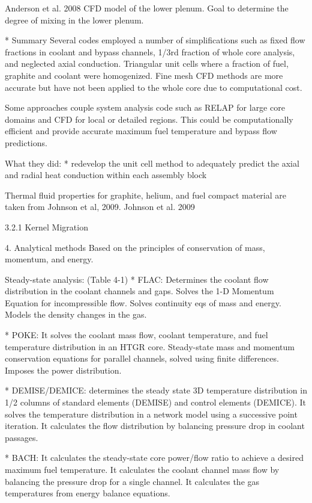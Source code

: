 Anderson et al. 2008 %
CFD model of the lower plenum.
Goal to determine the degree of mixing in the lower plenum.

* Summary
Several codes employed a number of simplifications such as fixed flow fractions in coolant and bypass channels, 1/3rd fraction of whole core analysis, and neglected axial conduction.
Triangular unit cells where a fraction of fuel, graphite and coolant were homogenized.
Fine mesh CFD methods are more accurate but have not been applied to the whole core due to computational cost.

Some approaches couple system analysis code such as RELAP for large core domains and CFD for local or detailed regions.
This could be computationally efficient and provide accurate maximum fuel temperature and bypass flow predictions.

What they did:
* redevelop the unit cell method to adequately predict the axial and radial heat conduction within each assembly block

Thermal fluid properties for graphite, helium, and fuel compact material are taken from Johnson et al, 2009.
Johnson et al. 2009 %

3.2.1 Kernel Migration

4. Analytical methods
Based on the principles of conservation of mass, momentum, and energy.

Steady-state analysis: (Table 4-1)
* FLAC:
Determines the coolant flow distribution in the coolant channels and gaps.
Solves the 1-D Momentum Equation for incompressible flow.
Solves continuity eqs of mass and energy.
Models the density changes in the gas.

* POKE:
It solves the coolant mass flow, coolant temperature, and fuel temperature distribution in an HTGR core.
Steady-state mass and momentum conservation equations for parallel channels, solved using finite differences.
Imposes the power distribution.

* DEMISE/DEMICE: determines the steady state 3D temperature distribution in 1/2 columns of standard elements (DEMISE) and control elements (DEMICE).
It solves the temperature distribution in a network model using a successive point iteration.
It calculates the flow distribution by balancing pressure drop in coolant passages.

* BACH:
It calculates the steady-state core power/flow ratio to achieve a desired maximum fuel temperature.
It calculates the coolant channel mass flow by balancing the pressure drop for a single channel.
It calculates the gas temperatures from energy balance equations.


